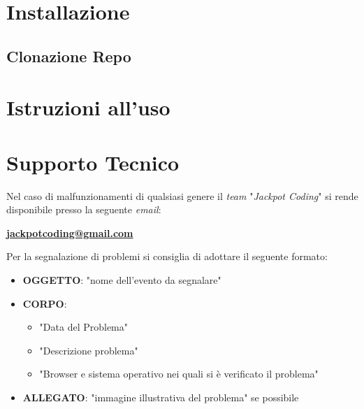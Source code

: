 \documentclass[5pt]{article}
\begin{document}
		\section{Installazione}
        \subsection{Clonazione Repo}
 
        \section{Istruzioni all'uso}
        
        \section{Supporto Tecnico}
        	Nel caso di malfunzionamenti di qualsiasi genere il \textit{team} "\textit{Jackpot Coding}" si rende disponibile presso la seguente \textit{email}:
        	\begin{center}
        		\textbf{\url{jackpotcoding@gmail.com}}
        	\end{center}

			Per la segnalazione di problemi si consiglia di adottare il seguente formato:
			\begin{itemize}
				\item \textbf{OGGETTO}: "nome dell'evento da segnalare"
				\item \textbf{CORPO}:
				\begin{itemize}
					\item "Data del Problema"
					\item "Descrizione problema"
					\item "Browser e sistema operativo nei quali si è verificato il problema"
				\end{itemize}
				\item \textbf{ALLEGATO}: "immagine illustrativa del problema" se possibile
			\end{itemize}
        
        
        
			
\end{document}
